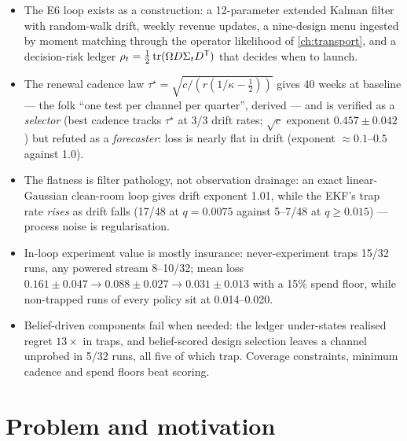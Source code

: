 \begin{keyideas}
\begin{itemize}
\item The E6 loop exists as a construction: a 12-parameter extended Kalman filter with random-walk drift, weekly revenue updates, a nine-design menu ingested by moment matching through the operator likelihood of \cref{ch:transport}, and a decision-risk ledger $\rho_t = \tfrac12\operatorname{tr}(\Omega D\Sigma_tD^{\mathsf{T}})$ that decides when to launch.
\item The renewal cadence law $\tau^\star = \sqrt{c/(r(1/\kappa - \tfrac12))}$ gives 40 weeks at baseline --- the folk ``one test per channel per quarter'', derived --- and is verified as a \emph{selector} (best cadence tracks $\tau^\star$ at 3/3 drift rates; $\sqrt c$ exponent $0.457 \pm 0.042$) but refuted as a \emph{forecaster}: loss is nearly flat in drift (exponent $\approx 0.1$--$0.5$ against 1.0).
\item The flatness is filter pathology, not observation drainage: an exact linear-Gaussian clean-room loop gives drift exponent 1.01, while the EKF's trap rate \emph{rises} as drift falls (17/48 at $q = 0.0075$ against 5--7/48 at $q \ge 0.015$) --- process noise is regularisation.
\item In-loop experiment value is mostly insurance: never-experiment traps 15/32 runs, any powered stream 8--10/32; mean loss $0.161 \pm 0.047 \to 0.088 \pm 0.027 \to 0.031 \pm 0.013$ with a 15\% spend floor, while non-trapped runs of every policy sit at 0.014--0.020.
\item Belief-driven components fail when needed: the ledger under-states realised regret $13\times$ in traps, and belief-scored design selection leaves a channel unprobed in 5/32 runs, all five of which trap. Coverage constraints, minimum cadence and spend floors beat scoring.
\end{itemize}
\end{keyideas}

\section{Problem and motivation}

